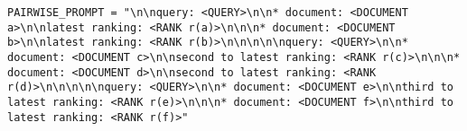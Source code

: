 \begin{verbatim}
PAIRWISE_PROMPT = "\n\nquery: <QUERY>\n\n* document: <DOCUMENT a>\n\nlatest ranking: <RANK r(a)>\n\n\n* document: <DOCUMENT b>\n\nlatest ranking: <RANK r(b)>\n\n\n\n\nquery: <QUERY>\n\n* document: <DOCUMENT c>\n\nsecond to latest ranking: <RANK r(c)>\n\n\n* document: <DOCUMENT d>\n\nsecond to latest ranking: <RANK r(d)>\n\n\n\n\nquery: <QUERY>\n\n* document: <DOCUMENT e>\n\nthird to latest ranking: <RANK r(e)>\n\n\n* document: <DOCUMENT f>\n\nthird to latest ranking: <RANK r(f)>"
\end{verbatim}